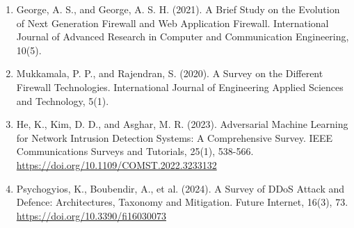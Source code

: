 \documentclass[12pt,a4paper]{article}
\begin{document}
\begin{enumerate}
\item George, A. S., and George, A. S. H. (2021). A Brief Study on the Evolution of Next Generation Firewall and Web Application Firewall. International Journal of Advanced Research in Computer and Communication Engineering, 10(5).
\item Mukkamala, P. P., and Rajendran, S. (2020). A Survey on the Different Firewall Technologies. International Journal of Engineering Applied Sciences and Technology, 5(1).
\item He, K., Kim, D. D., and Asghar, M. R. (2023). Adversarial Machine Learning for Network Intrusion Detection Systems: A Comprehensive Survey. IEEE Communications Surveys and Tutorials, 25(1), 538-566. \url{https://doi.org/10.1109/COMST.2022.3233132}
\item Psychogyios, K., Boubendir, A., et al. (2024). A Survey of DDoS Attack and Defence: Architectures, Taxonomy and Mitigation. Future Internet, 16(3), 73. \url{https://doi.org/10.3390/fi16030073}
\end{enumerate}
\end{document}
